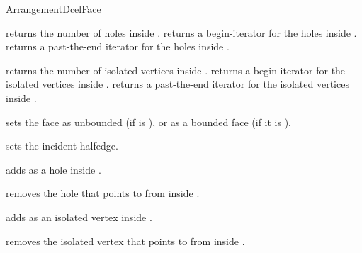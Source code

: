 \begin{ccRefConcept}{ArrangementDcelFace}
{
  {returns the number of holes inside \ccVar{}.}
\ccGlue
{}
  {returns a begin-iterator for the holes inside \ccVar{}.}
\ccGlue
{}
  {returns a past-the-end iterator for the holes inside \ccVar{}.}

  {returns the number of isolated vertices inside \ccVar{}.}
\ccGlue
{}
  {returns a begin-iterator for the isolated vertices inside \ccVar{}.}
\ccGlue
{}
  {returns a past-the-end iterator for the isolated vertices inside 
   \ccVar{}.}

\ccModifiers

  {sets the face as unbounded (if  is ), or as a bounded
   face (if it is ).}

  {sets the incident halfedge.}

  {adds  as a hole inside \ccVar{}.}

  {removes the hole that  points to from inside \ccVar{}.}
  
  {adds  as an isolated vertex inside \ccVar{}.}

  {removes the isolated vertex that  points to from inside \ccVar{}.}

} %

\ccSeeAlso

\\
 \\

\end{ccRefConcept}  

\ccRefPageEnd
